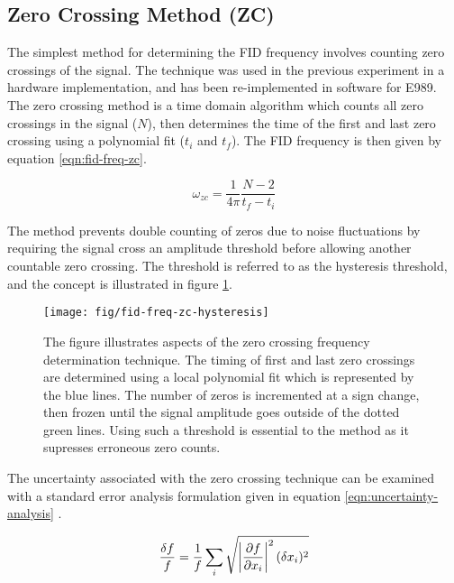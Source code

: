 \subsection{Zero Crossing Method (ZC)}
The simplest method for determining the FID frequency involves counting zero crossings of the signal.  The technique was used in the previous \mugmtwo experiment in a hardware implementation, and has been re-implemented in software for E989.  The zero crossing method is a time domain algorithm which counts all zero crossings in the signal ($N$), then determines the time of the first and last zero crossing using a polynomial fit ($t_i$ and $t_f$).  The FID frequency is then given by equation \ref{eqn:fid-freq-zc}.

\begin{equation}
\label{eqn:fid-freq-zc}
\omega_{zc} = \frac{1}{4 \pi}\frac{N - 2}{t_f - t_i}
\end{equation}

\noindent
The method prevents double counting of zeros due to noise fluctuations by requiring the signal cross an amplitude threshold before allowing another countable zero crossing.  The threshold is referred to as the hysteresis threshold, and the concept is illustrated in figure \ref{fig:fid-freq-zc-hysteresis}.

\begin{figure}
\centering
\texttt{[image: fig/fid-freq-zc-hysteresis]}
\caption{
    The figure illustrates aspects of the zero crossing frequency determination technique.  The timing of first and last zero crossings are determined using a local polynomial fit which is represented by the blue lines.  The number of zeros is incremented at a sign change, then frozen until the signal amplitude goes outside of the dotted green lines.  Using such a threshold is essential to the method as it supresses erroneous zero counts.
    \label{fig:fid-freq-zc-hysteresis}
}
\end{figure}

The uncertainty associated with the zero crossing technique can be examined with a standard error analysis formulation given in equation \ref{eqn:uncertainty-analysis} \cite{error-taylor}.

\begin{equation}
\label{eqn:uncertainty-analysis}
\frac{\delta f}{f} = \frac{1}{f} \sum_{i} \\
\sqrt{\left| \frac{\partial f}{\partial x_i} \right|^2 (\delta x_i)^2}
\end{equation}

